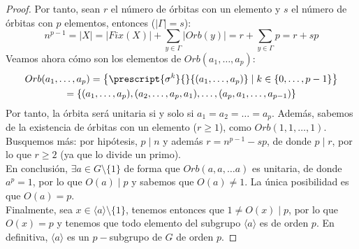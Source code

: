 \begin{teo}[de Cauchy]
\begin{proof}
        \noindent
        Por tanto, sean $r$ el número de órbitas con un elemento y $s$ el número de órbitas con $p$ elementos, entonces ($|\Gamma| = s$):
        \begin{equation*}
            n^{p-1} = |X| = |Fix(X)| + \sum_{y\in \Gamma} |Orb(y)| = r + \sum_{y\in \Gamma} p = r + sp
        \end{equation*}
        Veamos ahora cómo son los elementos de $Orb(a_1,\ldots,a_p)$:
        \begin{multline*}
            Orb(a_1,\ldots,a_p) = \left\{\prescript{\sigma^k}{}{(a_1,\ldots,a_p)} \mid k\in \{0,\ldots,p-1\}\right\} \\
            = \{(a_1,\ldots,a_p), (a_2, \ldots, a_p, a_1), \ldots, (a_p, a_1, \ldots, a_{p-1})\}
        \end{multline*}
        Por tanto, la órbita será unitaria si y solo si $a_1 = a_2 = \ldots = a_p$. Además, sabemos de la existencia de órbitas con un elemento ($r\geq 1$), como $Orb(1,1,\ldots,1)$. Busquemos más: por hipótesis, $p \mid n$ y además $r = n^{p-1}-sp $, de donde $p\mid r$, por lo que $r\geq 2$ (ya que lo divide un primo).\\

        \noindent
        En conclusión, $\exists a\in G\setminus \{1\}$ de forma que $Orb(a,a,\ldots a)$ es unitaria, de donde $a^p = 1$, por lo que $O(a) \mid p$ y sabemos que $O(a)\neq 1$. La única posibilidad es que $O(a) = p$.\\

        \noindent
        Finalmente, sea $x\in \langle a \rangle \setminus \{1\}$, tenemos entonces que $1 \neq O(x) \mid p$, por lo que $O(x) = p$ y tenemos que todo elemento del subgrupo $\langle a \rangle $ es de orden $p$. En definitiva, $\langle a \rangle $ es un $p-$subgrupo de $G$ de orden $p$.
    \end{proof}
\end{teo}

